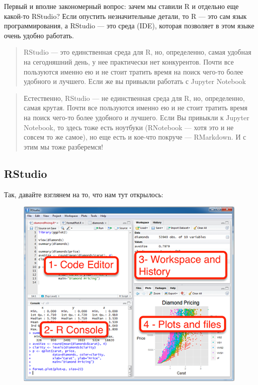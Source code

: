 \documentclass[]{book}
\begin{document}
Первый и вполне закономерный вопрос: зачем мы ставили R и отдельно еще
какой-то RStudio? Если опустить незначительные детали, то R --- это сам
язык программирования, а RStudio --- это среда (IDE), которая позволяет
в этом языке очень удобно работать.

\begin{quote}
RStudio --- это единственная среда для R, но, определенно, самая удобная
на сегодняшний день, у нее практически нет конкурентов. Почти все
пользуются именно ею и не стоит тратить время на поиск чего-то более
удобного и лучшего. Если же вы привыкли работать с Jupyter Notebook
\end{quote}

\begin{quote}
Естественно, RStudio --- не единственная среда для R, но, определенно,
самая крутая. Почти все пользуются именно ею и не стоит тратить время на
поиск чего-то более удобного и лучшего. Если Вы привыкли к Jupyter
Notebook, то здесь тоже есть ноутбуки (RNotebook --- хотя это и не
совсем то же самое), но еще есть и кое-что покруче --- RMarkdown. И с
этим мы тоже разберемся!
\end{quote}

\subsection{RStudio}\label{rstudio}

Так, давайте взглянем на то, что нам тут открылось:

\begin{figure}
\centering
\includegraphics{images/01_01_rstudio.png}
\caption{}
\end{figure}
\end{document}

